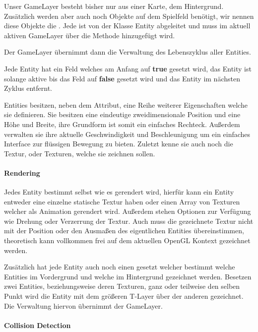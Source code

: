 
Unser GameLayer besteht bisher nur aus einer Karte, dem Hintergrund.
Zusätzlich werden aber auch noch Objekte auf dem Spielfeld benötigt, wir nennen diese Objekte die . 
Jede  ist von der Klasse Entity abgeleitet und muss im aktuell aktiven GameLayer über die Methode  hinzugefügt wird.

Der GameLayer übernimmt dann die Verwaltung des Lebenszyklus aller Entities.


Jede Entity hat ein  Feld welches am Anfang auf \textbf{true} gesetzt wird, das Entity ist solange aktive bis das Feld auf \textbf{false} gesetzt wird und das Entity im nächsten Zyklus entfernt.

Entities besitzen, neben dem  Attribut, eine Reihe weiterer Eigenschaften welche sie definieren. Sie besitzen eine eindeutige zweidimensionale Position und eine Höhe und Breite, ihre Grundform ist somit ein einfaches Rechteck. Außerdem verwalten sie ihre aktuelle Geschwindigkeit und Beschleunigung um ein einfaches Interface zur flüssigen Bewegung zu bieten. Zuletzt kenne sie auch noch die Textur, oder Texturen, welche sie zeichnen sollen.

\paragraph{Rendering}

Jedes Entity bestimmt selbst wie es gerendert wird, hierfür kann ein Entity entweder eine einzelne statische Textur haben oder einen Array von Texturen welcher als Animation gerendert wird. Außerdem stehen Optionen zur Verfügung wie Drehung oder Verzerrung der Textur.
Auch muss die gezeichnete Textur nicht mit der Position oder den Ausmaßen des eigentlichen Entities übereinstimmen, theoretisch kann vollkommen frei auf dem aktuellen OpenGL Kontext gezeichnet werden.

Zusätzlich hat jede Entity auch noch einen  gesetzt welcher bestimmt welche Entities im Vordergrund und welche im Hintergrund gezeichnet werden. Besetzen zwei Entities, beziehungsweise deren Texturen, ganz oder teilweise den selben Punkt wird die Entity mit dem größeren T-Layer über der anderen gezeichnet. Die Verwaltung hiervon übernimmt der GameLayer.
	
\paragraph{Collision Detection}

